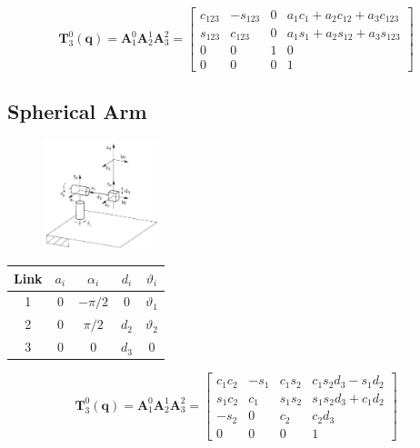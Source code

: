\documentclass[10pt]{article}
\begin{document}
\noindent
$$
    \boldsymbol{T}_{3}^{0}(\boldsymbol{q})=\boldsymbol{A}_{1}^{0} \boldsymbol{A}_{2}^{1} \boldsymbol{A}_{3}^{2}=\left[\begin{array}{cccc}
c_{123} & -s_{123} & 0 & a_{1} c_{1}+a_{2} c_{12}+a_{3} c_{123} \\
s_{123} & c_{123} & 0 & a_{1} s_{1}+a_{2} s_{12}+a_{3} s_{123} \\
0 & 0 & 1 & 0 \\
0 & 0 & 0 & 1
\end{array}\right]
$$





\subsection{Spherical Arm}
\begin{figure}[H]
    \centering
   \includegraphics[max width=0.3\textwidth]{./kinematics/spherical_arm}
    \label{c1.l2.fig.spherical-arm}
\end{figure}




\begin{table}[h]
\begin{center}
\begin{tabular}{ccccc}
\hline
Link & $a_{i}$ & $\alpha_{i}$ & $d_{i}$ & $\vartheta_{i}$ \\
\hline
1 & 0 & $-\pi / 2$ & 0 & $\vartheta_{1}$ \\
2 & 0 & $\pi / 2$ & $d_{2}$ & $\vartheta_{2}$ \\
3 & 0 & 0 & $d_{3}$ & 0 \\
\hline
\end{tabular}
\end{center}
\end{table}


$$
\boldsymbol{T}_{3}^{0}(\boldsymbol{q})=\boldsymbol{A}_{1}^{0} \boldsymbol{A}_{2}^{1} \boldsymbol{A}_{3}^{2}=\left[\begin{array}{cccc}
c_{1} c_{2} & -s_{1} & c_{1} s_{2} & c_{1} s_{2} d_{3}-s_{1} d_{2} \\
s_{1} c_{2} & c_{1} & s_{1} s_{2} & s_{1} s_{2} d_{3}+c_{1} d_{2} \\
-s_{2} & 0 & c_{2} & c_{2} d_{3} \\
0 & 0 & 0 & 1
\end{array}\right]
$$
\end{document}
